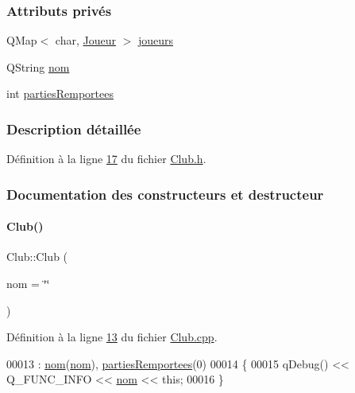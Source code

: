 \subsubsection*{Attributs privés}
\begin{DoxyCompactItemize}
\item 
Q\+Map$<$ char, \hyperlink{class_joueur}{Joueur} $>$ \hyperlink{class_club_a1546f281ba72a07e52cbfd2a60af699b}{joueurs}
\item 
Q\+String \hyperlink{class_club_a18e1489d02110a82a0c8706f52091002}{nom}
\item 
int \hyperlink{class_club_a1c5dd1362656cb4829de483255ffc39a}{parties\+Remportees}
\end{DoxyCompactItemize}


\subsubsection{Description détaillée}


Définition à la ligne \hyperlink{_club_8h_source_l00017}{17} du fichier \hyperlink{_club_8h_source}{Club.\+h}.



\subsubsection{Documentation des constructeurs et destructeur}
\mbox{\label{class_club_a6d6fa5971608a06394c40453289d6251}} 
\paragraph{\texorpdfstring{Club()}{Club()}}
{\footnotesize\ttfamily Club\+::\+Club (\begin{DoxyParamCaption}\item[{Q\+String}]{nom = {\ttfamily \char`\"{}\char`\"{}} }\end{DoxyParamCaption})}



Définition à la ligne \hyperlink{_club_8cpp_source_l00013}{13} du fichier \hyperlink{_club_8cpp_source}{Club.\+cpp}.


\begin{DoxyCode}
00013                       : \hyperlink{class_club_a18e1489d02110a82a0c8706f52091002}{nom}(\hyperlink{class_club_a18e1489d02110a82a0c8706f52091002}{nom}), \hyperlink{class_club_a1c5dd1362656cb4829de483255ffc39a}{partiesRemportees}(0)
00014 \{
00015     qDebug() << Q\_FUNC\_INFO << \hyperlink{class_club_a18e1489d02110a82a0c8706f52091002}{nom} << \textcolor{keyword}{this};
00016 \}
\end{DoxyCode}
\mbox{\label{class_club_a1c2993e141cfa6468284274359cc7de5}} 
